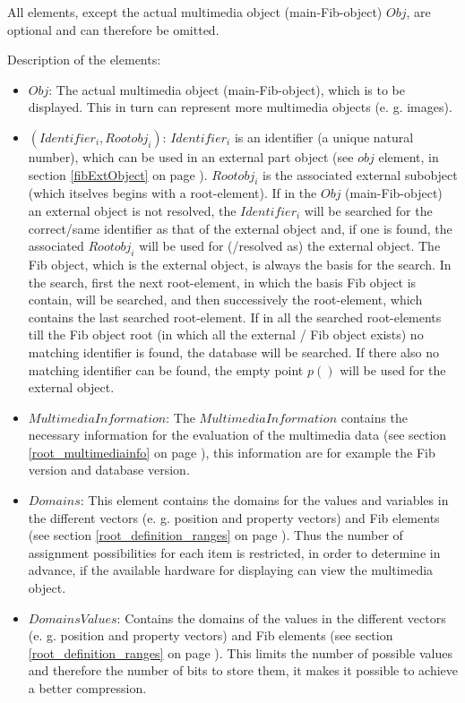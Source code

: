 All elements, except the actual multimedia object (main-Fib-object) $Obj$, are optional and can therefore be omitted.

\bigskip\noindent
Description of the elements:
\begin{itemize}
 \item $Obj$: The actual multimedia object (main-Fib-object), which is to be displayed. This in turn can represent more multimedia objects (e. g. images).
 \item $(Identifier_i, Rootobj_i)$: $Identifier_i$ is an identifier (a unique natural number), which can be used in an external part object (see $obj$ element, in section \ref{fibExtObject} on page \pageref{fibExtObject}). $Rootobj_i$ is the associated external subobject (which itselves begins with a root-element). If in the $Obj$ (main-Fib-object) an external object is not resolved, the $Identifier_i$ will be searched for the correct/same identifier as that of the external object and, if one is found, the associated $Rootobj_i$ will be used for (/resolved as) the external object. The Fib object, which is the external object, is always the basis for the search. In the search, first the next root-element, in which the basis Fib object is contain, will be searched, and then successively the root-element, which contains the last searched root-element. If in all the searched root-elements till the Fib object root (in which all the external / Fib object exists) no matching identifier is found, the database will be searched. If there also no matching identifier can be found, the empty point $p()$ will be used for the external object.
 \item $MultimediaInformation$: The $MultimediaInformation$ contains the necessary information for the evaluation of the multimedia data (see section \ref{root_multimediainfo} on page \pageref{root_multimediainfo}), this information are for example the Fib version and database version.
 \item $Domains$: This element contains the domains for the values and variables in the different vectors (e. g. position and property vectors) and Fib elements (see section \ref{root_definition_ranges} on page \pageref{root_definition_ranges}). Thus the number of assignment possibilities for each item is restricted, in order to determine in advance, if the available hardware for displaying can view the multimedia object.
\item $DomainsValues$: Contains the domains of the values in the different vectors (e. g. position and property vectors) and Fib elements (see section \ref{root_definition_ranges} on page \pageref{root_definition_ranges}). This limits the number of possible values and therefore the number of bits to store them, it makes it possible to achieve a better compression.

\end{itemize}
